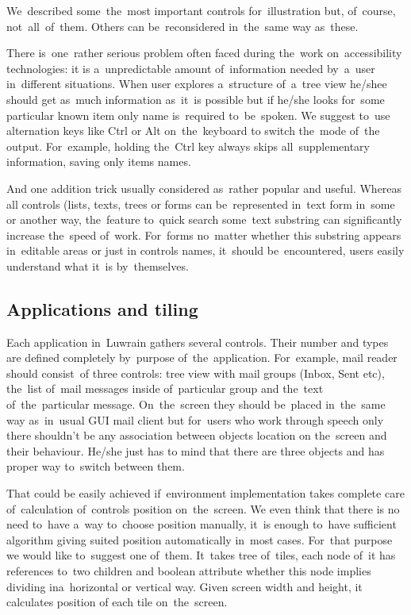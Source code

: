 \documentclass{acm_proc_article-sp}
\begin{document}
We~described some~the~most important controls for~illustration but, of~course, not~all~of~them.
Others can be~reconsidered in~the~same way as~these. 

There is~one~rather serious problem often faced during the~work on~accessibility technologies:
it is a~unpredictable amount of~information 
needed by~a~user in~different situations.
When user explores a~structure of~a~tree view he/shee should get as~much information as~it~is possible 
but if he/she looks for~some particular known item only   name is~required to~be~spoken.
We suggest to~use alternation keys like Ctrl or Alt on~the~keyboard to switch the~mode of~the output.
For~example, holding the~Ctrl key always skips all~supplementary information, saving only items names. 

And one addition trick usually considered as~rather popular and useful.
Whereas all controls (lists, texts, trees or forms  can be~represented in~text form in~some or another way, 
the~feature to~quick search some~text substring can significantly increase the~speed of~work.
For~forms no~matter  whether this substring appears  in~editable areas or just in controls names,
it~should be~encountered,
users easily understand what it~is by~themselves.

\subsection{Applications and tiling}

Each application in~Luwrain gathers several controls.
Their number and types are defined completely by~purpose of~the~application.
For~example, mail reader should  consist~of three controls:
tree view with mail groups (Inbox, Sent etc),
the~list of~mail messages inside of~particular group and the~text of~the~particular message.
On~the~screen they should be~placed in~the~same way as~in~usual GUI mail client 
but for~users who work through speech  only there shouldn't be any association 
between objects location on the~screen and their behaviour.
He/she just has to mind that there are three objects and has proper way to~switch between them.

That could be easily achieved if~environment implementation 
takes complete care of~calculation of~controls position on~the~screen.
We even think  that there is no need to~have a~way to~choose position manually,
it~is enough to~have sufficient algorithm giving suited position automatically in~most cases.
For~that purpose we would like to~suggest one of~them.
It~takes tree of~tiles, 
each node of~it has references to~two children and boolean attribute 
whether this node implies dividing  ina~horizontal or vertical way.
Given screen width and height, it calculates position of each tile on~the~screen.
\end{document}
